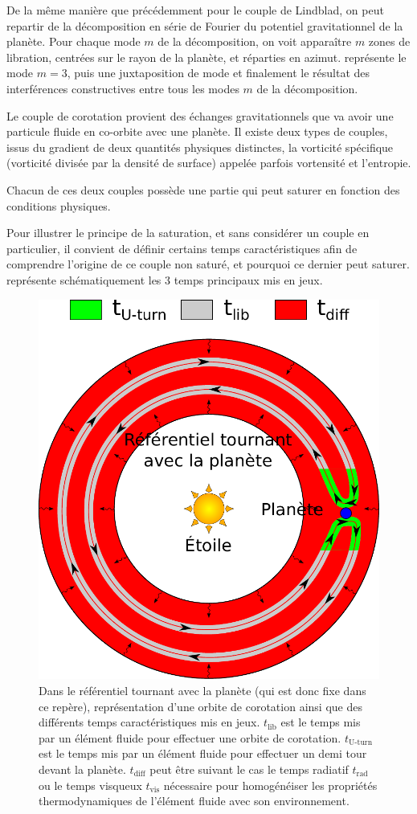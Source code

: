 De la même manière que précédemment pour le couple de Lindblad, on peut repartir de la décomposition en série de Fourier du potentiel gravitationnel de la planète. Pour chaque mode $m$ de la décomposition, on voit apparaître $m$ zones de libration, centrées sur le rayon de la planète, et réparties en azimut.  représente le mode $m=3$, puis une juxtaposition de mode et finalement le résultat des interférences constructives entre tous les modes $m$ de la décomposition.


Le couple de corotation provient des échanges gravitationnels que va avoir une particule fluide en co-orbite avec une planète. Il existe deux types de couples, issus du gradient de deux quantités physiques distinctes, la vorticité spécifique (vorticité divisée par la densité de surface) appelée parfois vortensité et l'entropie. 

Chacun de ces deux couples possède une partie qui peut saturer en fonction des conditions physiques. 

Pour illustrer le principe de la saturation, et sans considérer un couple en particulier, il convient de définir certains temps caractéristiques afin de comprendre l'origine de ce couple non saturé, et pourquoi ce dernier peut saturer.  représente schématiquement les 3 temps principaux mis en jeux. 

\begin{figure}[htbp]
\centering
\includegraphics[width=0.75\linewidth]{figure/corotation_times.pdf}
\caption{Dans le référentiel tournant avec la planète (qui est donc fixe dans ce repère), représentation d'une orbite de corotation ainsi que des différents temps caractéristiques mis en jeux. $t_\text{lib}$ est le temps mis par un élément fluide pour effectuer une orbite de corotation. $t_\text{U-turn}$ est le temps mis par un élément fluide pour effectuer un demi tour devant la planète. $t_\text{diff}$ peut être suivant le cas le temps radiatif $t_\text{rad}$ ou le temps visqueux $t_\text{vis}$ nécessaire pour homogénéiser les propriétés thermodynamiques de l'élément fluide avec son environnement.}\label{fig:corotation_orbits}
\end{figure}

